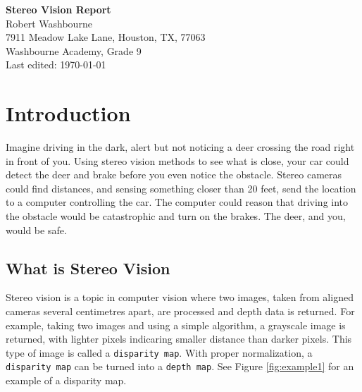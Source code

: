 \documentclass[11pt,fleqn]{article}
\begin{document}
\begin{center}
\huge{\textbf{Stereo Vision Report}}\\[20pt]
\Large{Robert Washbourne}\\[20pt]
7911 Meadow Lake Lane, Houston, TX, 77063\\[20pt]
Washbourne Academy, Grade 9\\[20pt]
Last edited: \today
\end{center}

\newpage
\tableofcontents
\listoffigures
\newpage
\normalsize

\section{Introduction}

Imagine driving in the dark, alert but not noticing a deer crossing the road right in front of you. Using stereo vision methods to see what is close, your car could detect the deer and brake before you even notice the obstacle. Stereo cameras could find distances, and sensing something closer than 20 feet, send the location to a computer controlling the car. The computer could reason that driving into the obstacle would be catastrophic and turn on the brakes. The deer, and you, would be safe.

\subsection{What is Stereo Vision}

Stereo vision is a topic in computer vision where two images, taken from aligned cameras several centimetres apart, are processed and depth data is returned. For example, taking two images and using a simple algorithm, a grayscale image is returned, with lighter pixels indicaring smaller distance than darker pixels. This type of image is called a \texttt{disparity map}. With proper normalization, a \texttt{disparity map} can be turned into a \texttt{depth map}. See Figure \ref{fig:example1} for an example of a disparity map.\\[5pt]
\end{document}
